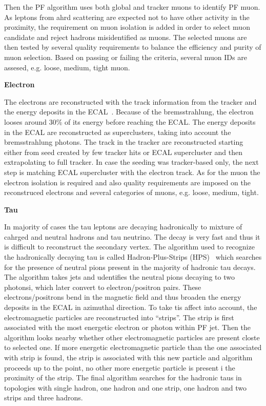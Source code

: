 Then the PF algorithm uses both global and tracker muons to identify PF muon. As leptons from ahrd scattering are expected not to have other activity in the proximity, the requirement on muon isolation is added in order to select muon candidate and reject hadrons misidentified as muons. The selected muons are then tested by several quality requirements to balance the efficiency and purity of muon selection. Based on passing or failing the criteria, several muon IDs are assesed, e.g. loose, medium, tight muon. 

\textbf{Electron}

The electrons are reconstructed with the track information from the tracker and the energy deposits in the ECAL~\cite{Khachatryan:2015hwa}. Because of the bremsstrahlung, the electron looses around 30\% of its energy before reaching the ECAL. The energy deposits in the ECAL are reconstructed as superclusters, taking into account the bremsstrahlung photons. The track in the tracker are reconstructed starting either from seed created by few tracker hits or ECAL supercluster and then extrapolating to full tracker. In case the seeding was tracker-based only, the next step is matching ECAL supercluster with the electron track. As for the muon the electron isolation is required and also quality requirements are imposed on the reconstruced electrons and several categories of muons, e.g. loose, medium, tight.



\textbf{Tau}

In majority of cases the tau leptons are decaying hadronically to mixture of cahrged and neutral hadrons and tau neutrino. The decay is very fast and thus it is difficult to reconstruct the secondary vertex. The algorithm used to recognize the hadronically decaying tau is called Hadron-Plus-Strips (HPS)~\cite{CMS:2016gvn} which searches for the presence of neutral pions present in the majority of hadronic tau decays. The algorithm takes jets and udentifies the neutral pions decaying to two photonsi, which later convert to electron/positron pairs. These electrons/positrons bend in the magnetic field and thus broaden the energy deposits in the ECAL in azimuthal direction. To take tis affect into account, the electromagnetic particles  are reconstructed into ``strips''. The strip is first associated with the most energetic electron or photon within PF jet. Then the algorithm looks nearby whether other electromagnetic particles are present closte to selected one. If more energetic electromagnetic particle than the one associated with strip is found, the strip is associated with this new particle and algorithm proceeds up to the point, no other more energetic particle is present i  the proximity of the strip. The final algorithm searches for the hadronic taus in topologies with single hadron, one hadron and one strip, one hadron and two strips and three hadrons.

